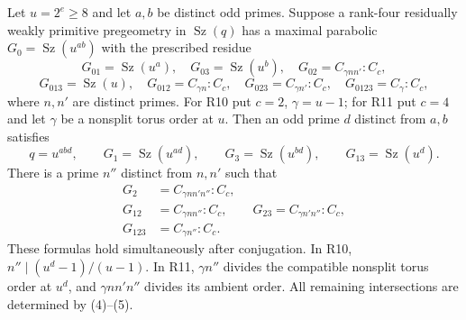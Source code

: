 \documentclass[11pt,a4paper]{article}
\newcommand{\Sz}{\operatorname{Sz}}\newcommand{\F}{\mathbb F}
\begin{document}
\begin{theorem}\label{extensions}
Let $u=2^e\ge8$ and let $a,b$ be distinct odd primes. Suppose a
rank-four residually weakly primitive pregeometry in $\Sz(q)$ has
a maximal parabolic $G_0=\Sz(u^{ab})$ with the prescribed residue
\[
 G_{01}=\Sz(u^a),\quad G_{03}=\Sz(u^b),\quad
 G_{02}=C_{\gamma nn'}:C_c,
\]
\[
 G_{013}=\Sz(u),\quad G_{012}=C_{\gamma n}:C_c,
 \quad G_{023}=C_{\gamma n'}:C_c,
 \quad G_{0123}=C_\gamma:C_c,                  \tag{4}
\]
where $n,n'$ are distinct primes. For R10 put $c=2$, $\gamma=u-1$;
for R11 put $c=4$ and let $\gamma$ be a nonsplit torus order at $u$.
Then an odd prime $d$ distinct from $a,b$ satisfies
\[
 q=u^{abd},\qquad G_1=\Sz(u^{ad}),\qquad
 G_3=\Sz(u^{bd}),\qquad G_{13}=\Sz(u^d).
\]
There is a prime $n''$ distinct from $n,n'$ such that
\[
 \begin{split}
 G_2&=C_{\gamma nn'n''}:C_c,\\
 G_{12}&=C_{\gamma nn''}:C_c,\qquad
 G_{23}=C_{\gamma n'n''}:C_c,\\
 G_{123}&=C_{\gamma n''}:C_c.
 \end{split}                                \tag{5}
\]
These formulas hold simultaneously after conjugation. In R10,
$n''\mid(u^d-1)/(u-1)$. In R11, $\gamma n''$ divides the compatible
nonsplit torus order at $u^d$, and $\gamma nn'n''$ divides its
ambient order. All remaining intersections are determined by (4)--(5).
\end{theorem}
\end{document}
